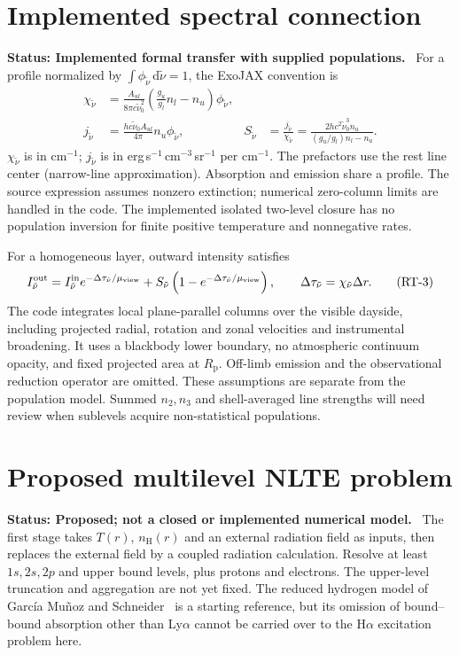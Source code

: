 \documentclass[11pt,a4paper]{article}
\newcommand{\dd}{\mathrm{d}}
\newcommand{\nH}{n_{\mathrm H}}
\newcommand{\wn}{\tilde\nu}
\newcommand{\Rp}{R_{\mathrm p}}
\newcommand{\status}[1]{\par\noindent\textbf{Status: #1.}\ }
\begin{document}
\section{Implemented spectral connection}\label{sec:spectrum}
\status{Implemented formal transfer with supplied populations}
For a profile normalized by $\int\phi_{\wn}\,\dd\wn=1$, the ExoJAX
 convention is
\begin{align}
 \chi_{\wn}
 &=\frac{A_{ul}}{8\pi c\wn_0^2}
    \left(\frac{g_u}{g_l}n_l-n_u\right)\phi_{\wn},
 \tag{RT-1}\label{eq:extinction}\\
 j_{\wn}
 &=\frac{hc\wn_0A_{ul}}{4\pi}n_u\phi_{\wn},
 &S_{\wn}&=\frac{j_{\wn}}{\chi_{\wn}}
   =\frac{2hc^2\wn_0^3n_u}{(g_u/g_l)n_l-n_u}.
 \tag{RT-2}\label{eq:emissivity}
\end{align}
$\chi_{\wn}$ is in cm$^{-1}$; $j_{\wn}$ is in
erg\,s$^{-1}$\,cm$^{-3}$\,sr$^{-1}$ per cm$^{-1}$.
The prefactors use the rest line center (narrow-line approximation).
Absorption and emission share a profile. The source expression assumes
nonzero extinction; numerical zero-column limits are handled in the code.
The implemented isolated two-level closure has no population inversion for
finite positive temperature and nonnegative rates.

For a homogeneous layer, outward intensity satisfies
\begin{equation}
 I_{\wn}^{\rm out}=I_{\wn}^{\rm in}
       e^{-\Delta\tau_{\wn}/\mu_{\rm view}}
 +S_{\wn}\left(1-e^{-\Delta\tau_{\wn}/\mu_{\rm view}}\right),
 \qquad \Delta\tau_{\wn}=\chi_{\wn}\Delta r.
 \tag{RT-3}\label{eq:formal-transfer}
\end{equation}
The code integrates local plane-parallel columns over the visible dayside,
including projected radial, rotation and zonal velocities and instrumental
broadening. It uses a blackbody lower boundary, no atmospheric continuum
opacity, and fixed projected area at $\Rp$. Off-limb emission and the
observational reduction operator are omitted. These assumptions are separate
from the population model. Summed $n_2,n_3$ and shell-averaged line strengths
will need review when sublevels acquire non-statistical populations.

\section{Proposed multilevel NLTE problem}\label{sec:nlte}
\status{Proposed; not a closed or implemented numerical model}
The first stage takes $T(r)$, $\nH(r)$ and an external radiation field as
inputs, then replaces the external field by a coupled radiation calculation.
Resolve at least $1s,2s,2p$ and upper bound levels, plus protons and electrons.
The upper-level truncation and aggregation are not yet fixed. The reduced
hydrogen model of Garc\'ia Mu\~noz and Schneider~\cite{garcia} is a starting
reference, but its omission of bound--bound absorption other than Ly$\alpha$
cannot be carried over to the H$\alpha$ excitation problem here.
\end{document}
